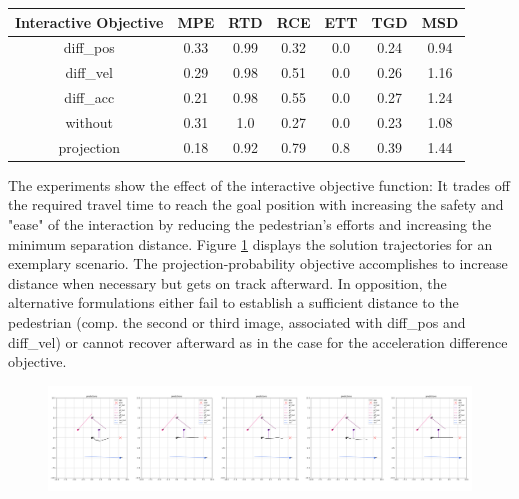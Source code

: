 \begin{table}[!ht]
\begin{center}
\begin{tabular}{c|c|c|c|c|c|c}
\bf Interactive Objective & \bf MPE & \bf RTD & \bf RCE & \bf ETT & \bf TGD & \bf MSD \\
\hline
diff\_pos & 0.33 & 0.99 & 0.32 & 0.0 & 0.24 & 0.94 \\
\hline
diff\_vel & 0.29 & 0.98 & 0.51 & 0.0 & 0.26 & 1.16 \\
\hline
diff\_acc & 0.21 & 0.98 & 0.55 & 0.0 & 0.27 & 1.24 \\ 
\hline
\rowcolor{baseline_color}
without & 0.31 & 1.0 & 0.27 & 0.0 & 0.23 & 1.08 \\ 
\hline
\rowcolor{our_color}
projection & 0.18 & 0.92 & 0.79 & 0.8 & 0.39 & 1.44 
\end{tabular}
\end{center}
\label{table:interactive_objective}
\end{table}

The experiments show the effect of the interactive objective function: It trades off the required travel time to reach the goal position with increasing the safety and "ease" of the interaction by reducing the pedestrian's efforts and increasing the minimum separation distance. Figure \ref{img:interactive_comp} displays the solution trajectories for an exemplary scenario.  The projection-probability objective accomplishes to increase distance when necessary but gets on track afterward. In opposition, the alternative formulations either fail to establish a sufficient distance to the pedestrian (comp. the second or third image, associated with diff\_pos and diff\_vel) or cannot recover afterward as in the case for the acceleration difference objective.

\begin{figure}[!ht]
\begin{center}
\includegraphics[width=\textwidth]{images/inter_comp_multi.png}
\label{img:interactive_comp}
\end{center}
\end{figure}

